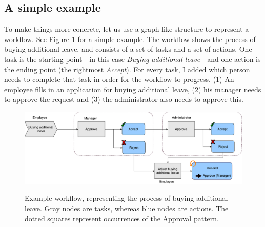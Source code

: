 \documentclass[a4paper,11pt]{article}
\begin{document}
\subsection{A simple example}
To make things more concrete, let us use a graph-like structure to represent a workflow. See Figure \ref{figure:example_workflow} for a simple example. The workflow shows the process of buying additional leave, and consists of a set of tasks and a set of actions. One task is the starting point - in this case \textit{Buying additional leave} - and one action is the ending point (the rightmost \textit{Accept}). For every task, I added which person needs to complete that task in order for the workflow to progress. (1) An employee fills in an application for buying additional leave, (2) his manager needs to approve the request and (3) the administrator also needs to approve this. 

\begin{figure}[H]
\centering
\includegraphics[width=\linewidth]{Example_Workflow.pdf}
\label{figure:example_workflow}
\caption{Example workflow, representing the process of buying additional leave. Gray nodes are tasks, whereas blue nodes are actions. The dotted squares represent occurrences of the Approval pattern.}
\end{figure}
\end{document}

